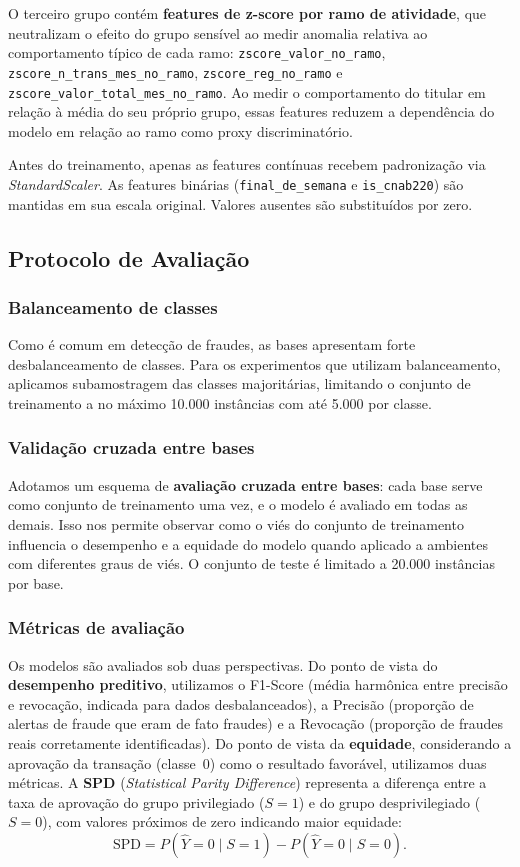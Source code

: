 O terceiro grupo contém \textbf{features de z-score por ramo de atividade}, que neutralizam o efeito do grupo sensível ao medir anomalia relativa ao comportamento típico de cada ramo: \texttt{zscore\_valor\_no\_ramo}, \texttt{zscore\_n\_trans\_mes\_no\_ramo}, \texttt{zscore\_reg\_no\_ramo} e \texttt{zscore\_valor\_total\_mes\_no\_ramo}. Ao medir o comportamento do titular em relação à média do seu próprio grupo, essas features reduzem a dependência do modelo em relação ao ramo como proxy discriminatório.

Antes do treinamento, apenas as features contínuas recebem padronização via \textit{StandardScaler}. As features binárias (\texttt{final\_de\_semana} e \texttt{is\_cnab220}) são mantidas em sua escala original. Valores ausentes são substituídos por zero.

\subsection{Protocolo de Avaliação}

\subsubsection{Balanceamento de classes}

Como é comum em detecção de fraudes, as bases apresentam forte desbalanceamento de classes. Para os experimentos que utilizam balanceamento, aplicamos subamostragem das classes majoritárias, limitando o conjunto de treinamento a no máximo 10.000 instâncias com até 5.000 por classe.

\subsubsection{Validação cruzada entre bases}

Adotamos um esquema de \textbf{avaliação cruzada entre bases}: cada base serve como conjunto de treinamento uma vez, e o modelo é avaliado em todas as demais. Isso nos permite observar como o viés do conjunto de treinamento influencia o desempenho e a equidade do modelo quando aplicado a ambientes com diferentes graus de viés. O conjunto de teste é limitado a 20.000 instâncias por base.

\subsubsection{Métricas de avaliação}

Os modelos são avaliados sob duas perspectivas. Do ponto de vista do \textbf{desempenho preditivo}, utilizamos o F1-Score (média harmônica entre precisão e revocação, indicada para dados desbalanceados), a Precisão (proporção de alertas de fraude que eram de fato fraudes) e a Revocação (proporção de fraudes reais corretamente identificadas). Do ponto de vista da \textbf{equidade}, considerando a aprovação da transação (classe~0) como o resultado favorável, utilizamos duas métricas. A \textbf{SPD} (\textit{Statistical Parity Difference}) representa a diferença entre a taxa de aprovação do grupo privilegiado ($S=1$) e do grupo desprivilegiado ($S=0$), com valores próximos de zero indicando maior equidade:
\[
\text{SPD} = P(\hat{Y} = 0 \mid S = 1) - P(\hat{Y} = 0 \mid S = 0).
\]

